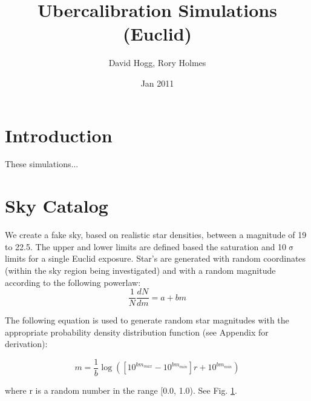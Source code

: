 \documentclass[12pt,a4paper,twoside]{article}
\author{David Hogg, Rory Holmes}
\title{Ubercalibration Simulations \\(Euclid)}
\date{Jan 2011}
\makeatletter
\def\maketitle{%
  \null
  \thispagestyle{empty}%
  \vfill
  \begin{center}\leavevmode
    \normalfont
    {\LARGE \@title\par}%
    \vskip 1cm
    {\Large \@author\par}%
    \vskip 1cm
    {\Large \@date\par}%
  \end{center}%
  \vfill
  \null
  \cleardoublepage
  }
\makeatother
\begin{document}
\maketitle

\section{Introduction}
These simulations... 

\section{Sky Catalog}
We create a fake sky, based on realistic star densities, between a magnitude of 19 to 22.5. The upper and lower limits are defined based the saturation and 10$\upsigma$ limits for a single Euclid exposure. Star's are generated with random coordinates (within the sky region being investigated) and with a random magnitude according to the following powerlaw:
\begin{equation}
\frac{1}{N} \frac{dN}{dm} = a + b m
\end{equation}

The following equation is used to generate random star magnitudes with the appropriate probability density distribution function (see Appendix for derivation):

\begin{equation}
m = \frac{1}{b} \log{(\left[ 10^{b m_{max}} - 10^{b m_{min}} \right] r + 10^{b m_{min}})}
\end{equation}

\noindent{}where r is a random number in the range [0.0, 1.0). See Fig. \ref{fig:catalog}. 

\begin{figure}[ht]
\centering
{}
\label{fig:catalog}
\end{figure}
\end{document}
